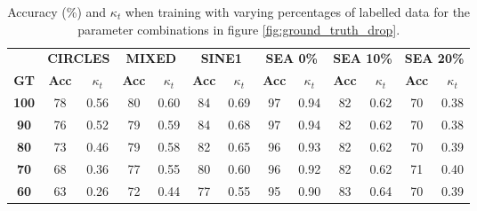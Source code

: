 \documentclass[runningheads]{llncs}
\begin{document}
\begin{table}
  \centering
  \caption{Accuracy (\%) and $\kappa_t$ when training with varying percentages of labelled data for the parameter combinations in figure \ref{fig:ground_truth_drop}.
  \label{table:ground_truth_Acc_kappa}}
  \begin{tabular}{|c||c|c|c|c|c|c|c|c|c|c|c|c|}
  \hline
   & \multicolumn{2}{c|}{\textbf{CIRCLES}} & \multicolumn{2}{c|}{\textbf{MIXED}} & \multicolumn{2}{c|}{\textbf{SINE1}} & \multicolumn{2}{c|}{\textbf{SEA 0\%}} & \multicolumn{2}{c|}{\textbf{SEA 10\%}} & \multicolumn{2}{c|}{\textbf{SEA 20\%}} \\ \cline{2-13} 
\multirow{-2}{*}{\textbf{GT}} & \multicolumn{1}{c|}{\textbf{Acc}} & \multicolumn{1}{c|}{\textbf{$\kappa_t$}} & \multicolumn{1}{c|}{\textbf{Acc}} & \multicolumn{1}{c|}{\textbf{$\kappa_t$}} & \multicolumn{1}{c|}{\textbf{Acc}} & \multicolumn{1}{c|}{\textbf{$\kappa_t$}} & \multicolumn{1}{c|}{\textbf{Acc}} & \multicolumn{1}{c|}{\textbf{$\kappa_t$}} & \multicolumn{1}{c|}{\textbf{Acc}} & \multicolumn{1}{c|}{\textbf{$\kappa_t$}} & \multicolumn{1}{c|}{\textbf{Acc}} & \multicolumn{1}{c|}{\textbf{$\kappa_t$}} \\ \hhline{=============}
  \textbf{100} & {\color[HTML]{656565} 78} & 0.56 & {\color[HTML]{656565} 80} & 0.60 & {\color[HTML]{656565} 84} & 0.69 & {\color[HTML]{656565} 97} & 0.94 & {\color[HTML]{656565} 82} & 0.62 & {\color[HTML]{656565} 70} & 0.38 \\ \hline
  \textbf{90} & {\color[HTML]{656565} 76} & 0.52 & {\color[HTML]{656565} 79} & 0.59 & {\color[HTML]{656565} 84} & 0.68 & {\color[HTML]{656565} 97} & 0.94 & {\color[HTML]{656565} 82} & 0.62 & {\color[HTML]{656565} 70} & 0.38 \\ \hline
  \textbf{80} & {\color[HTML]{656565} 73} & 0.46 & {\color[HTML]{656565} 79} & 0.58 & {\color[HTML]{656565} 82} & 0.65 & {\color[HTML]{656565} 96} & 0.93 & {\color[HTML]{656565} 82} & 0.62 & {\color[HTML]{656565} 70} & 0.39 \\ \hline
  \textbf{70} & {\color[HTML]{656565} 68} & 0.36 & {\color[HTML]{656565} 77} & 0.55 & {\color[HTML]{656565} 80} & 0.60 & {\color[HTML]{656565} 96} & 0.92 & {\color[HTML]{656565} 82} & 0.62 & {\color[HTML]{656565} 71} & 0.40 \\ \hline
  \textbf{60} & {\color[HTML]{656565} 63} & 0.26 & {\color[HTML]{656565} 72} & 0.44 & {\color[HTML]{656565} 77} & 0.55 & {\color[HTML]{656565} 95} & 0.90 & {\color[HTML]{656565} 83} & 0.64 & {\color[HTML]{656565} 70} & 0.39 \\ \hline
  \end{tabular}
  \end{table}
\end{document}
